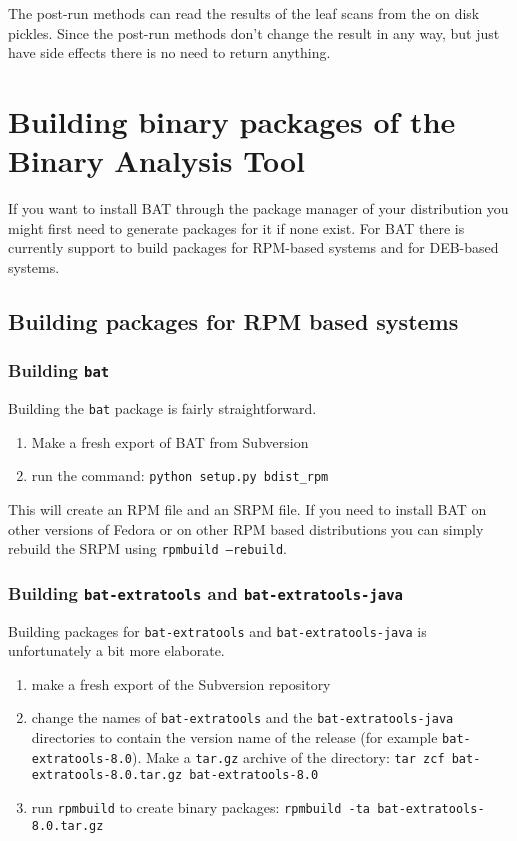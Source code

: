 \documentclass[10pt]{article}
\begin{document}
The post-run methods can read the results of the leaf scans from the on disk
pickles. Since the post-run methods don't change the result in any way, but
just have side effects there is no need to return anything.

\section{Building binary packages of the Binary Analysis Tool}

If you want to install BAT through the package manager of your distribution you
might first need to generate packages for it if none exist. For BAT there is
currently support to build packages for RPM-based systems and for DEB-based
systems.

\subsection{Building packages for RPM based systems}

\subsubsection{Building \texttt{bat}}

Building the \texttt{bat} package is fairly straightforward.

\begin{enumerate}
\item Make a fresh export of BAT from Subversion
\item run the command: \texttt{python setup.py bdist\_rpm}
\end{enumerate}

This will create an RPM file and an SRPM file. If you need to install BAT on
other versions of Fedora or on other RPM based distributions you can simply
rebuild the SRPM using \texttt{rpmbuild --rebuild}.

\subsubsection{Building \texttt{bat-extratools} and
\texttt{bat-extratools-java}}

Building packages for \texttt{bat-extratools} and \texttt{bat-extratools-java}
is unfortunately a bit more elaborate.

\begin{enumerate}
\item make a fresh export of the Subversion repository
\item change the names of \texttt{bat-extratools} and the
\texttt{bat-extratools-java} directories to contain the version name of the
release (for example \texttt{bat-extratools-8.0}). Make a \texttt{tar.gz}
archive of the directory:
\texttt{tar zcf bat-extratools-8.0.tar.gz bat-extratools-8.0}
\item run \texttt{rpmbuild} to create binary packages:
\texttt{rpmbuild -ta bat-extratools-8.0.tar.gz}
\end{enumerate}
\end{document}
